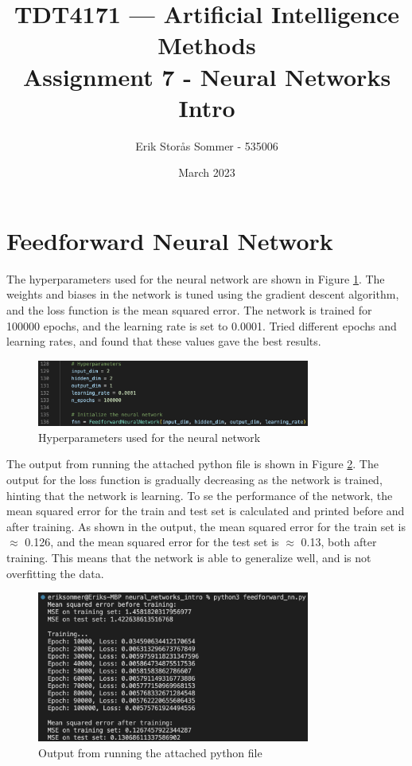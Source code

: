 \documentclass{article}
\title{TDT4171 — Artificial Intelligence Methods \\ Assignment 7 - Neural Networks Intro}
\author{Erik Storås Sommer - 535006}
\date{March 2023}
\begin{document}
\maketitle
\setlength{\parindent}{0pt}

\section*{Feedforward Neural Network}

The hyperparameters used for the neural network are shown in Figure \ref{fig:image1}.
The weights and biases in the network is tuned using the gradient descent algorithm, and the loss function is the mean squared error.
The network is trained for 100000 epochs, and the learning rate is set to 0.0001.
Tried different epochs and learning rates, and found that these values gave the best results.

\begin{figure}[hbtp]
    \centering
    \includegraphics[width=0.8\textwidth]{hyperparameters.png}
    \caption{Hyperparameters used for the neural network}
    \label{fig:image1}
\end{figure}

The output from running the attached python file is shown in Figure \ref{fig:image2}.
The output for the loss function is gradually decreasing as the network is trained, hinting that the network is learning.
To se the performance of the network, the mean squared error for the train and test set is calculated and printed before and after training.
As shown in the output, the mean squared error for the train set is $\approx$ 0.126, and the mean squared error for the test set is $\approx$ 0.13, both after training.
This means that the network is able to generalize well, and is not overfitting the data.

\begin{figure}[hbtp]
    \centering
    \includegraphics[width=0.8\textwidth]{output.png}
    \caption{Output from running the attached python file}
    \label{fig:image2}
\end{figure}
\end{document}
